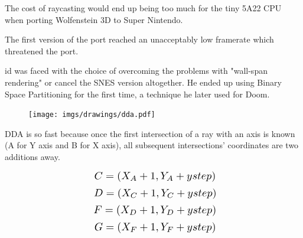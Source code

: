 \begin{figure} 
\vspace{-10pt}
\end{figure} 
 The cost of raycasting would end up being too much for the tiny 5A22 CPU when porting Wolfenstein 3D to Super Nintendo.\\
\par
 The first version of the port reached an unacceptably low framerate which threatened the port.\\
 \par
 id was faced with the choice of overcoming the problems with "wall-span rendering" or cancel the SNES version altogether. He ended up using Binary Space Partitioning for the first time, a technique he later used for Doom.

 




\begin{figure}[H]
  \centering
 \texttt{[image: imgs/drawings/dda.pdf]}
\end{figure}
\par


DDA is so fast because once the first intersection of a ray with an axis is known (A for Y axis and B for X axis), all subsequent intersections' coordinates are two additions away.
\par


\begin{equation*}
    \scalebox{1.3}{
$C = (X_{A} +1, Y_{A} + ystep)$\\
}
\end{equation*}
\begin{equation*}
    \scalebox{1.3}{
$D = (X_{C} +1, Y_{C} + ystep)$\\
}
\end{equation*}
\begin{equation*}
    \scalebox{1.3}{
$F = (X_{D} +1, Y_{D} + ystep)$\\
}
\end{equation*}
\begin{equation*}
    \scalebox{1.3}{
$G = (X_{F} +1, Y_{F} + ystep)$\\
}
\end{equation*}


